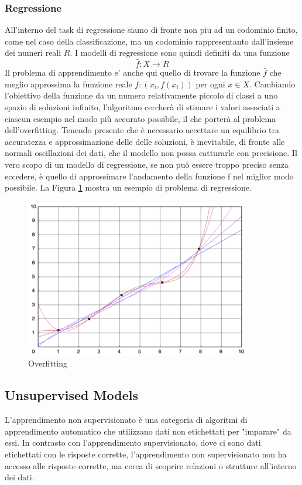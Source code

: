 \subsubsection{Regressione}
All'interno del task di regressione siamo di fronte non piu ad un codominio finito, come nel caso della classificazione, ma un codominio rappresentanto dall'insieme dei numeri reali \(R\). I modelli di regressione sono quindi definiti da una funzione
\[\hat{f}: X \rightarrow R\]
Il problema di apprendimento e' anche qui quello di trovare la funzione \(\hat{f}\) che meglio approssima la funzione reale \(f: (x_i, f(x_i))\) per ogni \(x\in X\).
Cambiando l'obiettivo della funzione da un numero relativamente piccolo di classi
a uno spazio di soluzioni infinito, l'algoritmo cercherà di stimare i valori associati a ciascun esempio nel modo più accurato possibile, il che porterà al problema dell'overfitting. Tenendo presente che è necessario accettare un equilibrio tra accuratezza e approssimazione delle delle soluzioni, è inevitabile, di fronte alle normali oscillazioni dei dati, che il modello non possa catturarle con precisione. Il vero scopo di un modello di regressione, se non può essere troppo preciso senza eccedere, è quello di approssimare l'andamento della funzione f nel miglior modo possibile. La Figura \ref{overfitting} mostra un esempio di problema di regressione.

\begin{figure}[t]
	\centering
	\includegraphics[width=10cm, scale=1]{images/overfitting}
	\caption{Overfitting}
	\label{overfitting}
\end{figure}


\subsection{Unsupervised Models}
L'apprendimento non supervisionato è una categoria di algoritmi di apprendimento automatico che utilizzano dati non etichettati per "imparare" da essi. In contrasto con l'apprendimento supervisionato, dove ci sono dati etichettati con le risposte corrette, l'apprendimento non supervisionato non ha accesso alle risposte corrette, ma cerca di scoprire relazioni o strutture all'interno dei dati.

